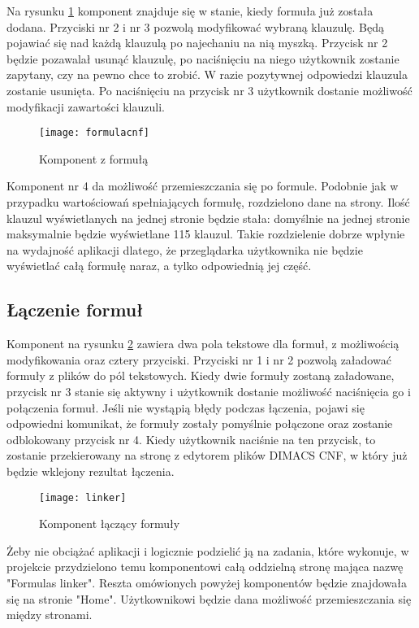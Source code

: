 \documentclass[a4paper,12pt]{book}
\theoremstyle{definition}
\begin{document}
Na rysunku \ref{fig:formulacnf} komponent znajduje się w stanie, kiedy formuła już została dodana. Przyciski nr 2 i nr 3 pozwolą modyfikować wybraną klauzulę. Będą pojawiać się nad każdą klauzulą po najechaniu na nią myszką. Przycisk nr 2 będzie pozawalał usunąć klauzulę, po naciśnięciu na niego użytkownik zostanie zapytany, czy na pewno chce to zrobić. W razie pozytywnej odpowiedzi klauzula zostanie usunięta. Po naciśnięciu na przycisk nr 3 użytkownik dostanie możliwość modyfikacji zawartości klauzuli.

\begin{figure}[ht]
    \centering
    \texttt{[image: formulacnf]}
    \caption{Komponent z formułą}
    \label{fig:formulacnf}
\end{figure}

Komponent nr 4 da możliwość przemieszczania się po formule. Podobnie jak w przypadku wartościowań spełniających formułę, rozdzielono dane na strony. Ilość klauzul wyświetlanych na jednej stronie będzie stała: domyślnie na jednej stronie maksymalnie będzie wyświetlane 115 klauzul. Takie rozdzielenie dobrze wpłynie na wydajność aplikacji dlatego, że przeglądarka użytkownika nie będzie wyświetlać całą formułę naraz, a tylko odpowiednią jej część.


\subsection{Łączenie formuł}

Komponent na rysunku \ref{fig:linker} zawiera dwa pola tekstowe dla formuł, z możliwością modyfikowania oraz cztery przyciski. Przyciski nr 1 i nr 2 pozwolą załadować formuły z plików do pól tekstowych. Kiedy dwie formuły zostaną załadowane, przycisk nr 3 stanie się aktywny i użytkownik dostanie możliwość naciśnięcia go i połączenia formuł. Jeśli nie wystąpią błędy podczas łączenia, pojawi się odpowiedni komunikat, że formuły zostały pomyślnie połączone oraz zostanie odblokowany przycisk nr 4. Kiedy użytkownik naciśnie na ten przycisk, to zostanie przekierowany na stronę z edytorem plików DIMACS CNF, w który już będzie wklejony rezultat łączenia. 

\begin{figure}[ht]
    \centering
    \texttt{[image: linker]}
    \caption{Komponent łączący formuły}
    \label{fig:linker}
\end{figure}

Żeby nie obciążać aplikacji i logicznie podzielić ją na zadania, które wykonuje, w projekcie przydzielono temu komponentowi całą oddzielną stronę mająca nazwę "Formulas linker". Reszta omówionych powyżej komponentów będzie znajdowała się na stronie "Home". Użytkownikowi będzie dana możliwość przemieszczania się między stronami.
\end{document}
